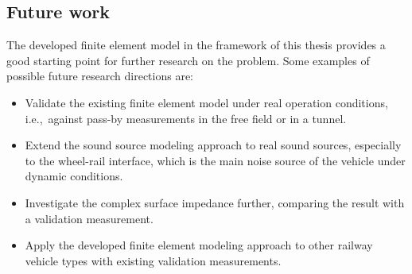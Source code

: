 \subsection*{Future work}
The developed finite element model in the framework of this thesis provides a good starting point for further research on the problem. Some examples of possible future research directions are:
\begin{itemize}
	\item Validate the existing finite element model under real operation conditions, i.e.,\ against pass-by measurements in the free field or in a tunnel.
	\item Extend the sound source modeling approach to real sound sources, especially to the wheel-rail interface, which is the main noise source of the vehicle under dynamic conditions.
	\item Investigate the complex surface impedance further, comparing the result with a validation measurement.
	\item Apply the developed finite element modeling approach to other railway vehicle types with existing validation measurements.
\end{itemize}